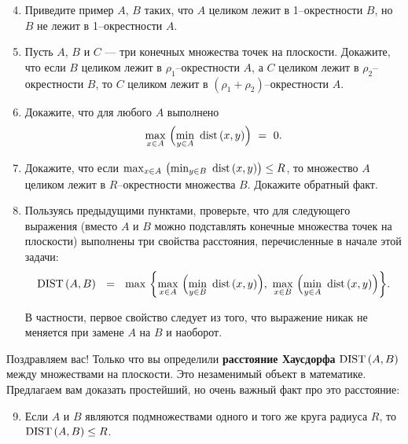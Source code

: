 \begin{enumerate}
\setcounter{enumi}{3}

\item Приведите пример $A$, $B$ таких, что $A$ целиком лежит в 1--окрестности $B$, но $B$ не лежит в 1--окрестности $A$.

\item Пусть $A$, $B$ и $C$ — три конечных множества точек на плоскости. Докажите, что если $B$ целиком лежит в $\rho_1$--окрестности $A$, а $C$ целиком лежит в $\rho_2$--окрестности $B$, то $C$ целиком лежит в $(\rho_1 + \rho_2)$--окрестности $A$.

\item Докажите, что для любого $A$ выполнено
\vspace{-0.2cm}
$$\max\limits_{x \in A}\ \Bigl(\min\limits_{y \in A}\ \mathrm{dist}\, (x,y)\Bigr)\ =\ 0.$$

\vspace{-0.35cm}
\item Докажите, что если $\max_{x \in A}\ \bigl(\min_{y \in B}\ \dist (x,y)\bigr) \leq R$, то множество $A$ целиком лежит в $R$--окрестности множества $B$. Докажите обратный факт.

\item Пользуясь предыдущими пунктами, проверьте, что для следующего выражения (вместо $A$ и $B$ можно подставлять конечные множества точек на плоскости) выполнены три свойства расстояния, перечисленные в начале этой задачи:
\vspace{-0.2cm}
$$\mathrm{DIST}\, (A,B)\ \ =\ \ \max\ \biggl\{\max\limits_{x \in A}\ \Bigl(\min\limits_{y \in B}\ \mathrm{dist}\, (x,y)\Bigr),
	\ \max\limits_{x \in B}\ \Bigl(\min\limits_{y \in A}\ \mathrm{dist}\, (x,y)\Bigr)\biggr\}.$$

\vspace{-0.2cm} В частности, первое свойство следует из того, что выражение никак не меняется при замене $A$ на $B$ и наоборот.
\end{enumerate}

\noindent Поздравляем вас! Только что вы определили {\bfseries расстояние Хаусдорфа} $\mathrm{DIST}\, (A,B)$ между множествами на плоскости. Это незаменимый объект в математике. Предлагаем вам доказать простейший, но очень важный факт про это расстояние:

\begin{enumerate}
\setcounter{enumi}{8}
\item Если $A$ и $B$ являются подмножествами одного и того же круга радиуса $R$, то $\mathrm{DIST}\, (A, B) \leq R$.
\end{enumerate}